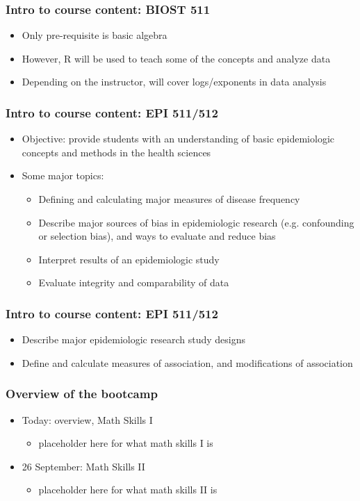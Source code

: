 \documentclass[12pt]{beamer}
\newcommand{\myframe}[1]{\begin{frame} \frametitle{#1}}
\newenvironment{spaceitemize}
{ \begin{itemize}
    \setlength{\itemsep}{10pt}
    \setlength{\parskip}{0pt}
    \setlength{\parsep}{0pt}     }
{ \end{itemize}                  }
\begin{document}
\myframe{Intro to course content: BIOST 511}
\begin{spaceitemize}
\item Only pre-requisite is basic algebra
\item However, R will be used to teach some of the concepts and analyze data
\item Depending on the instructor, will cover logs/exponents in data analysis
\end{spaceitemize}
\end{frame}


\myframe{Intro to course content: EPI 511/512}
\begin{spaceitemize}
\item Objective: provide students with an understanding of basic epidemiologic concepts and methods in the health sciences 
\item Some major topics:
\begin{spaceitemize}
\item Defining and calculating major measures of disease frequency
\item Describe major sources of bias in epidemiologic research (e.g. confounding or selection bias), and ways to evaluate and reduce bias
\item Interpret results of an epidemiologic study
\item Evaluate integrity and comparability of data
\end{spaceitemize}
\end{spaceitemize}
\end{frame}

\myframe{Intro to course content: EPI 511/512}
\begin{spaceitemize}
\item Describe major epidemiologic research study designs
\item Define and calculate measures of association, and modifications of association
\end{spaceitemize}
\end{frame}

\myframe{Overview of the bootcamp}
\begin{spaceitemize}
\item Today: overview, Math Skills I
\begin{spaceitemize}
\item placeholder here for what math skills I is
\end{spaceitemize}
\item 26 September: Math Skills II
\begin{spaceitemize}
\item placeholder here for what math skills II is
\end{spaceitemize}
\end{spaceitemize}
\end{frame}
\end{document}

